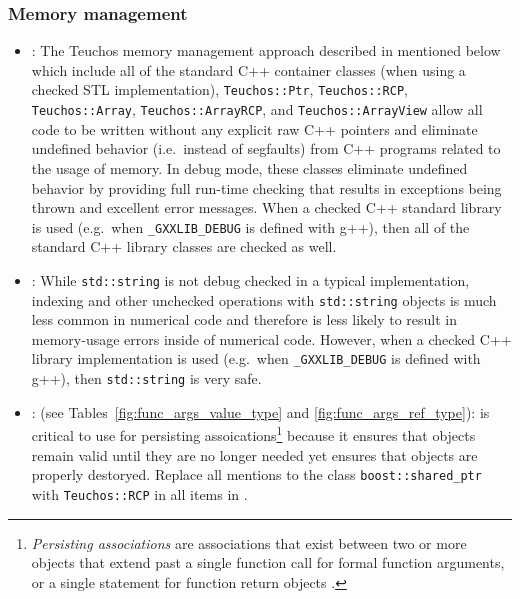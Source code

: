 %
\subsubsection{Memory management}
%


\begin{itemize}


{}\item\GCGAvoidRawPointers: The Teuchos memory management approach
described in {}\cite{TeuchosMemoryManagementGuide} mentioned below
which include all of the standard C++ container classes (when using a
checked STL implementation), {}\texttt{Teuchos::\-Ptr},
{}\texttt{Teuchos::\-RCP}, {}\texttt{Teuchos::\-Array},
{}\texttt{Teuchos::\-Array\-RCP}, and
{}\texttt{Teuchos::\-Array\-View} allow all code to be written without
any explicit raw C++ pointers and eliminate undefined behavior (i.e.\
instead of segfaults) from C++ programs related to the usage of
memory.  In debug mode, these classes eliminate undefined behavior by
providing full run-time checking that results in exceptions being
thrown and excellent error messages.  When a checked C++ standard
library is used (e.g.\ when {}\texttt{\_GXXLIB\_DEBUG} is defined with
g++), then all of the standard C++ library classes are checked as
well.


{}\item\GCGUseStdString: While {}\texttt{std\-::string} is not debug checked
in a typical implementation, indexing and other unchecked operations with
{}\texttt{std\-::string} objects is much less common in numerical code and
therefore is less likely to result in memory-usage errors inside of numerical
code.  However, when a checked C++ library implementation is used (e.g.\ when
{}\texttt{\_GXXLIB\_DEBUG} is defined with g++), then {}\texttt{std\-::string}
is very safe.


{}\item\GCGTeuchosRCP: (see Tables~\ref{fig:func_args_value_type} and
{}\ref{fig:func_args_ref_type}): {}\ttt{Teuchos\-::RCP} is critical to
use for persisting assoications\footnote{\textit{Persisting
associations} are associations that exist between two or more objects
that extend past a single function call for formal function arguments,
or a single statement for function return objects
{}\cite{RefCountPtrBeginnersGuide, TeuchosMemoryManagementGuide}.} 
because it ensures that objects remain valid until they are no longer
needed yet ensures that objects are properly destoryed.  Replace all
mentions to the class {}\texttt{boost::\-shared\_ptr} with
{}\texttt{Teuchos::\-RCP} in all items in
{}\cite{C++CodingStandards05}.



\end{itemize}
